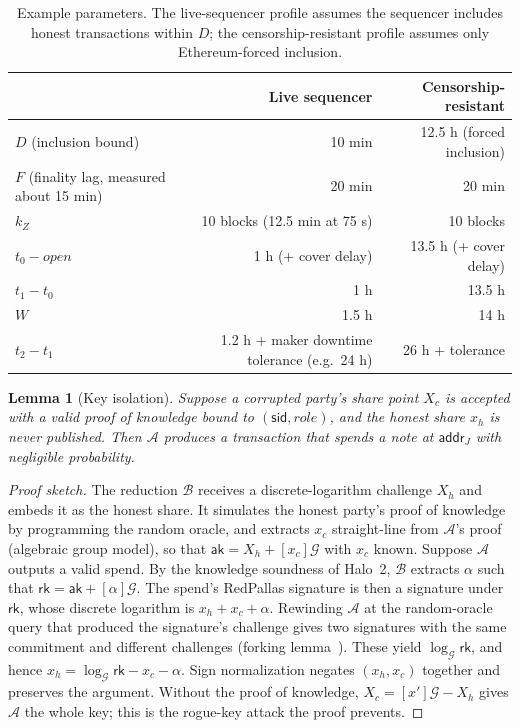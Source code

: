 \documentclass[10pt,letterpaper]{article}
\makeatletter
\renewcommand\section{\@startsection{section}{1}{\z@}{-1.3em}{0.45em}{\normalfont\large\bfseries}}
\theoremstyle{plain}
\newtheorem{lemma}{Lemma}
\theoremstyle{definition}
\newcommand{\ak}{\mathsf{ak}}
\newcommand{\rk}{\mathsf{rk}}
\newcommand{\Gor}{\mathcal{G}}
\makeatother
\begin{document}
\begin{table}[H]
\centering\small
\begin{tabular}{@{}lrr@{}}
\toprule
& \textbf{Live sequencer} & \textbf{Censorship-resistant}\\
\midrule
$D$ (inclusion bound) & 10 min & 12.5 h (forced inclusion)\\
$F$ (finality lag, measured about 15 min) & 20 min & 20 min\\
$k_Z$ & 10 blocks (12.5 min at 75 s) & 10 blocks\\
$t_0 - \mathit{open}$ & 1 h (+ cover delay) & 13.5 h (+ cover delay)\\
$t_1 - t_0$ & 1 h & 13.5 h\\
$W$ & 1.5 h & 14 h\\
$t_2 - t_1$ & 1.2 h + maker downtime tolerance (e.g.\ 24 h) & 26 h + tolerance\\
\bottomrule
\end{tabular}
\caption{Example parameters. The live-sequencer profile assumes the sequencer includes honest transactions within $D$; the censorship-resistant profile assumes only Ethereum-forced inclusion.}
\label{tab:params}
\end{table}

\section{Security Analysis}

\begin{lemma}[Key isolation]
Suppose a corrupted party's share point $X_c$ is accepted with a valid proof of knowledge bound to
$(\mathsf{sid}, \mathit{role})$, and the honest share $x_h$ is never published. Then $\mathcal{A}$
produces a transaction that spends a note at $\mathsf{addr}_J$ with negligible probability.
\end{lemma}
\begin{proof}[Proof sketch]
The reduction $\mathcal{B}$ receives a discrete-logarithm challenge $X_h$ and embeds it as the
honest share. It simulates the honest party's proof of knowledge by programming the random
oracle, and extracts $x_c$ straight-line from $\mathcal{A}$'s proof (algebraic group model), so
that $\ak = X_h + [x_c]\Gor$ with $x_c$ known. Suppose $\mathcal{A}$ outputs a valid spend. By the
knowledge soundness of Halo~2, $\mathcal{B}$ extracts $\alpha$ such that $\rk = \ak + [\alpha]\Gor$.
The spend's RedPallas signature is then a signature under $\rk$, whose discrete logarithm is
$x_h + x_c + \alpha$. Rewinding $\mathcal{A}$ at the random-oracle query that produced the
signature's challenge gives two signatures with the same commitment and different challenges
(forking lemma~\cite{pointcheval}). These yield $\log_{\Gor}\rk$, and hence
$x_h = \log_{\Gor}\rk - x_c - \alpha$. Sign normalization negates $(x_h, x_c)$ together and
preserves the argument. Without the proof of knowledge, $X_c = [x']\Gor - X_h$ gives $\mathcal{A}$
the whole key; this is the rogue-key attack the proof prevents.
\end{proof}
\end{document}
